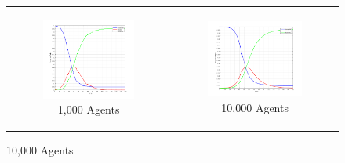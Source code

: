 \begin{figure}
\begin{center}
\begin{tabular}{c c}
    	\\
    	
		\begin{subfigure}[b]{0.3\textwidth}
			\centering
			\includegraphics[width=1\textwidth, angle=0]{./fig/step1_randmonad/SIR_1000agents_150t_1dt.png}
			\caption{1,000 Agents}
			\label{fig:sir_abs_approximating_1dt_1000agents}
		\end{subfigure}
		& 
		\begin{subfigure}[b]{0.3\textwidth}
			\centering
			\includegraphics[width=1\textwidth, angle=0]{./fig/step1_randmonad/SIR_10000agents_150t_1dt.png}
			\caption{10,000 Agents}
			\label{fig:sir_abs_approximating_1dt_10000agents}
		\end{subfigure}
	\end{tabular}
	

\end{center}
\end{figure}
